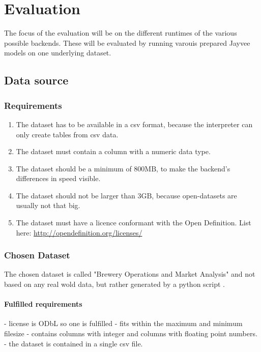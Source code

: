 \chapter{Evaluation}
\label{chapter:Evaluation}

The focus of the evaluation will be on the different runtimes of the various possible backends. These will be evaluated by running varouis prepared Jayvee models on one underlying dataset.

\section{Data source}
\label{section:data_source}

\subsection{Requirements}
\label{subsection:data_source_requirements}
\begin{enumerate}
	\item The dataset has to be available in a csv format, because the interpreter can only create tables from csv data.
	\item The dataset must contain a column with a numeric data type.
	\item The dataset should be a minimum of $800\text{MB}$, to make the backend's differences in speed visible.
	\item The dataset should not be larger than $3\text{GB}$, because open-datasets are usually not that big. %
	\item The dataset must have a licence conformant with the Open Definition. List here: \url{http://opendefinition.org/licenses/} %
\end{enumerate}


\subsection{Chosen Dataset}
The chosen dataset is called "Brewery Operations and Market Analysis" and not based on any real wold data, but rather generated by a python script \autocite{dataset}.

\subsubsection{Fulfilled requirements}
- license is \ac{ODbL} so one is fulfilled
- fits within the maximum and minimum filesize
- contains columns with integer and columns with floating point numbers.
- the dataset is contained in a single csv file.

